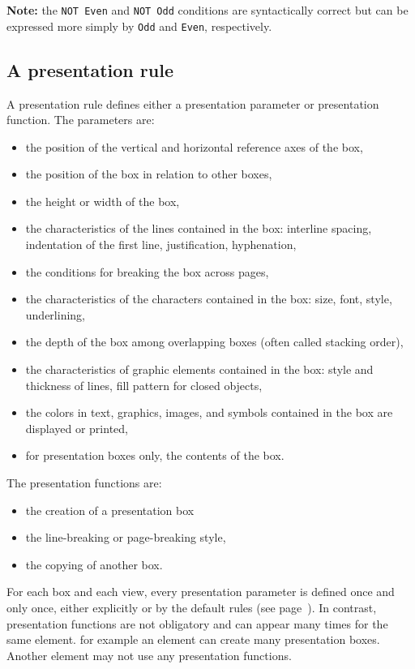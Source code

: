 {\bf Note:} the {\tt NOT Even} and {\tt NOT Odd} conditions are
syntactically correct but can be expressed more simply by {\tt Odd}
and {\tt Even}, respectively.

\subsection{A presentation rule}
\label{reglepres}

A presentation rule defines either a presentation parameter or
presentation function.  The parameters are:
\begin{itemize}
\item the position of the vertical and horizontal reference axes of
the box,
\item the position of the box in relation to other boxes,
\item the height or width of the box,
\item the characteristics of the lines contained in the box: interline
spacing, indentation of the first line, justification, hyphenation,
\item the conditions for breaking the box across pages,
\item the characteristics of the characters contained in the box:
size, font, style, underlining,
\item the depth of the box among overlapping boxes (often called
stacking order),
\item the characteristics of graphic elements contained in the box:
style and thickness of lines, fill pattern for closed objects,
\item the colors in text, graphics, images, and symbols contained in
the box are displayed or printed,
\item for presentation boxes only, the contents of the box.
\end{itemize}
The presentation functions are:
\label{fonctpres}
\begin{itemize}
\item the creation of a presentation box
\item the line-breaking or page-breaking style,
\item the copying of another box.
\end{itemize}

For each box and each view, every presentation parameter is defined
once and only once, either explicitly or by the default rules (see
page~\pageref{reglesdefaut}).  In contrast, presentation functions are
not obligatory and can appear many times for the same element.  for
example an element can create many presentation boxes.  Another
element may not use any presentation functions.

